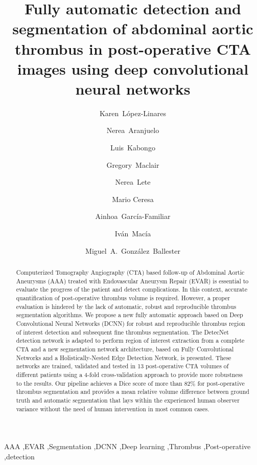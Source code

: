\documentclass[preprint,authoryear,12pt]{elsarticle}
\begin{document}
\begin{frontmatter}

\title{Fully automatic detection and segmentation of abdominal aortic thrombus in post-operative CTA images using deep convolutional neural networks}
\author[add1,add2,add5]{Karen~L\'opez-Linares}
\author[add1]{Nerea~Aranjuelo}
\author[add1,add2]{Luis~Kabongo}
\author[add1,add2]{Gregory~Maclair}
\author[add1]{Nerea~Lete}
\author[add5]{Mario Ceresa}
\author[add2,add3]{Ainhoa~Garc\'ia-Familiar}
\author[add1,add2]{Iv\'an~Mac\'ia}
\author[add4,add5]{Miguel~A.~Gonz\'alez~Ballester}

\address[add1]{Vicomtech Foundation, San Sebasti\'an, Spain}
\address[add2]{Biodonostia Health Research Institute, San Sebasti\'an, Spain}
\address[add3]{Hospital Universitario Donostia, San Sebasti\'an, Spain}
\address[add4]{ICREA, Barcelona, Spain}
\address[add5]{Universitat Pompeu Fabra, Barcelona, Spain}

\begin{abstract}
Computerized Tomography Angiography (CTA) based follow-up of Abdominal Aortic Aneurysms (AAA) treated with Endovascular Aneurysm Repair (EVAR) is essential to evaluate the progress of the patient and detect complications. In this context, accurate quantification of post-operative thrombus volume is required. However, a proper evaluation is hindered by the lack of automatic, robust and reproducible thrombus segmentation algorithms. %
We propose a new fully automatic approach based on Deep Convolutional Neural Networks (DCNN) for robust and reproducible thrombus region of interest detection and subsequent fine thrombus segmentation. The DetecNet detection network is adapted to perform region of interest extraction from a complete CTA and a new segmentation network architecture, based on Fully Convolutional Networks and a Holistically-Nested Edge Detection Network, is presented. These networks are trained, validated and tested in 13 post-operative CTA volumes of different patients using a 4-fold cross-validation approach to provide more robustness to the results. Our pipeline achieves a Dice score of more than 82\% for post-operative thrombus segmentation and provides a mean relative volume difference between ground truth and automatic segmentation that lays within the experienced human observer variance without the need of human intervention in most common cases.    
\end{abstract}


\begin{keyword}
   AAA \sep EVAR \sep Segmentation \sep DCNN \sep Deep learning \sep Thrombus \sep Post-operative \sep detection
\end{keyword}

\end{frontmatter}
\end{document}
